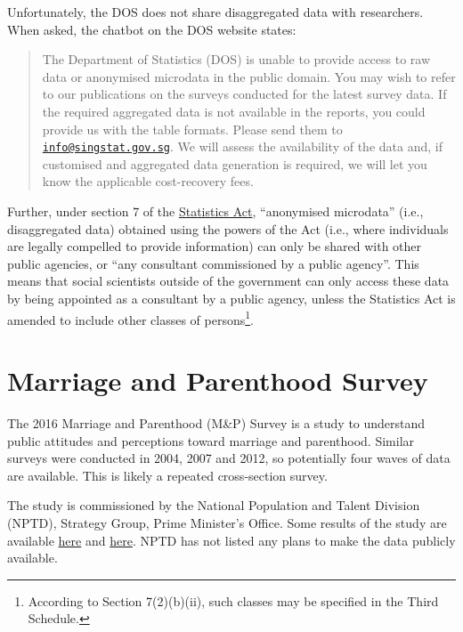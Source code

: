 \documentclass[
  openany]{book}
\begin{document}
Unfortunately, the DOS does not share disaggregated data with researchers. When asked, the chatbot on the DOS website states:

\begin{quote}
The Department of Statistics (DOS) is unable to provide access to raw data or anonymised microdata in the public domain. You may wish to refer to our publications on the surveys conducted for the latest survey data. If the required aggregated data is not available in the reports, you could provide us with the table formats. Please send them to \href{mailto:info@singstat.gov.sg}{\nolinkurl{info@singstat.gov.sg}}. We will assess the availability of the data and, if customised and aggregated data generation is required, we will let you know the applicable cost-recovery fees.
\end{quote}

Further, under section 7 of the \href{https://sso.agc.gov.sg/Act/SA1973}{Statistics Act}, ``anonymised microdata'' (i.e., disaggregated data) obtained using the powers of the Act (i.e., where individuals are legally compelled to provide information) can only be shared with other public agencies, or ``any consultant commissioned by a public agency''. This means that social scientists outside of the government can only access these data by being appointed as a consultant by a public agency, unless the Statistics Act is amended to include other classes of persons\footnote{According to Section 7(2)(b)(ii), such classes may be specified in the Third Schedule.}.

\hypertarget{mps}{%
\section{Marriage and Parenthood Survey}\label{mps}}

The 2016 Marriage and Parenthood (M\&P) Survey is a study to understand public attitudes and perceptions toward marriage and parenthood. Similar surveys were conducted in 2004, 2007 and 2012, so potentially four waves of data are available. This is likely a repeated cross-section survey.

The study is commissioned by the National Population and Talent Division (NPTD), Strategy Group, Prime Minister's Office. Some results of the study are available \href{https://www.strategygroup.gov.sg/media-centre/press-releases/marriage-parenthood-study-2012}{here} and \href{https://www.strategygroup.gov.sg/media-centre/press-releases/article/details/key-findings-from-marriage-and-parenthood-survey-2016}{here}. NPTD has not listed any plans to make the data publicly available.
\end{document}
